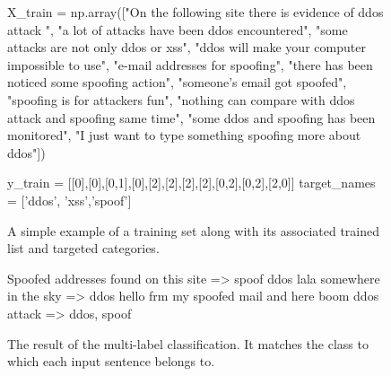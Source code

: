 \documentclass[12pt]{article}
\begin{document}
\begin{figure}[h!]
\begin{footnotesize}
\begin{spverbatim}
X_train = np.array(["On the following site there is evidence of ddos attack ",
                    "a lot of attacks have been ddos encountered",
                    "some attacks are not only ddos or xss",
                    "ddos will make your computer impossible to use",
                    "e-mail addresses for spoofing",
                    "there has been noticed some spoofing action",
                    "someone's email got spoofed",
                    "spoofing is for attackers fun",
                    "nothing can compare with ddos attack and spoofing same time",
                    "some ddos and spoofing has been monitored",
                    "I just want to type something spoofing more about ddos"])

y_train = [[0],[0],[0,1],[0],[2],[2],[2],[2],[0,2],[0,2],[2,0]]
target_names = ['ddos', 'xss','spoof']

\end{spverbatim}
\end{footnotesize}
\captionsetup{font=small}
\caption{A simple example of a training set along with its associated trained list and targeted categories.}
\label{fig:trainset}
\end{figure}
\begin{figure}[h!]
\begin{footnotesize}
\begin{spverbatim}
Spoofed addresses found on this site => spoof
ddos lala somewhere in the sky => ddos
hello frm my spoofed mail and here boom ddos attack => ddos, spoof
\end{spverbatim}
\end{footnotesize}
\captionsetup{font=small}
\caption{The result of the multi-label classification. It matches the class to which each input sentence belongs to.}
\label{fig:trainset-result}
\end{figure}
\newpage
\end{document}

